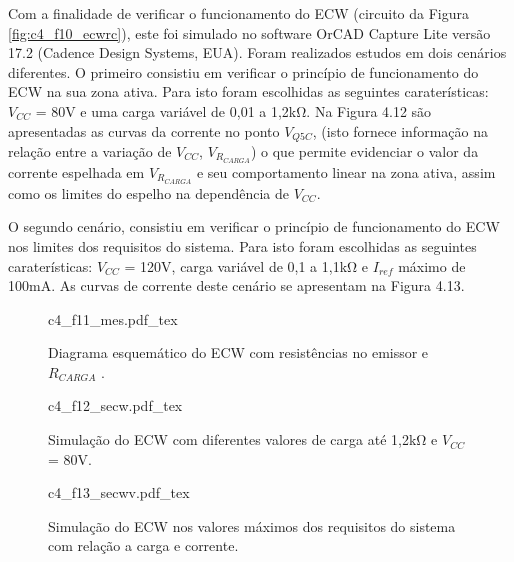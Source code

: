 Com a finalidade de verificar o funcionamento do \acrshort{ECW} (circuito da Figura \ref{fig:c4_f10_ecwrc}), este foi simulado no software OrCAD Capture Lite versão 17.2 (Cadence Design Systems, EUA). Foram realizados estudos em dois cenários diferentes. O primeiro consistiu em verificar o princípio de funcionamento do \acrshort{ECW} na sua zona ativa. Para isto foram escolhidas as seguintes caraterísticas: $V_{CC}$ = 80V e uma carga variável de 0,01 a 1,2k$\mathrm{\Omega}$. Na Figura 4.12 são apresentadas as curvas da corrente no ponto $V_{Q5C}$, (isto fornece informação na relação entre a variação de $V_{CC}$, $V_{R_{CARGA}}$) o que permite evidenciar o valor da corrente espelhada em $V_{R_{CARGA}}$ e seu comportamento linear na zona ativa, assim como os limites do espelho na dependência de $V_{CC}$. 

O segundo cenário, consistiu em verificar o princípio de funcionamento do \acrshort{ECW} nos limites dos requisitos do sistema. Para isto foram escolhidas as seguintes caraterísticas: $V_{CC}$ = 120V, carga variável de 0,1 a 1,1k$\mathrm{\Omega}$ e $I_{ref}$ máximo de 100mA. As curvas de corrente deste cenário se apresentam na Figura 4.13.
 
\begin{figure}
    \centering %
    \small %
    \def\svgwidth{1\columnwidth}%
    {c4_f11_mes.pdf_tex}
    \caption{Diagrama esquemático do \acrshort{ECW} com resistências no emissor e $R_{CARGA}$  \cite{NacimentoJunqueira2003EletroestimuladorDigital}.}
    \label{fig:c4_f11_mes}
\end{figure}


\begin{figure}
    \centering %
    \small %
    \def\svgwidth{0.9\columnwidth}%
    {c4_f12_secw.pdf_tex}
    \caption{Simulação do \acrshort{ECW} com diferentes valores de carga até 1,2k$\mathrm{\Omega}$ e $V_{CC}$ = 80V.}
    \label{fig:c4_f12_secw}
\end{figure}


\begin{figure}
    \centering %
    \small %
    \def\svgwidth{0.9\columnwidth}%
    {c4_f13_secwv.pdf_tex}
    \caption{Simulação do \acrshort{ECW} nos valores máximos dos requisitos do sistema com relação a carga e corrente.}
    \label{fig:c4_f13_secwv}
\end{figure}

